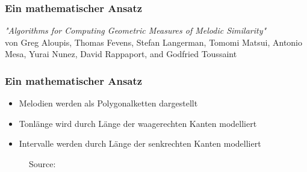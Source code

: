 \documentclass{beamer}
\begin{document}
    \begin{frame}
		\frametitle{Ein mathematischer Ansatz}
		\begin{minipage}{0.45\textwidth}
			\begin{center}
				\textit{"Algorithms for Computing Geometric Measures of Melodic Similarity"} 
				\cite{one}  \\ 
				von Greg Aloupis, Thomas Fevens, Stefan Langerman, Tomomi Matsui, Antonio Mesa, Yurai Nunez, David Rappaport, and Godfried Toussaint
			\end{center}
		\end{minipage}%
		\begin{minipage}{0.45\textwidth}
			\begin{figure}[h!]
			\end{figure}
		\end{minipage}
	\end{frame}
	
	\begin{frame}
        \frametitle{Ein mathematischer Ansatz}
        \begin{minipage}{0.45\textwidth}
            \begin{itemize}
             \item Melodien werden als Polygonalketten dargestellt
             \item Tonlänge wird durch Länge der waagerechten Kanten modelliert
             \item Intervalle werden durch Länge der senkrechten Kanten modelliert 
            \end{itemize}
        \end{minipage}
        \begin{minipage}{0.45\textwidth}
        \begin{figure}[h!]
             \caption{Source: \cite{one}}
        \end{figure}
        \end{minipage}
	\end{frame}
\end{document}
